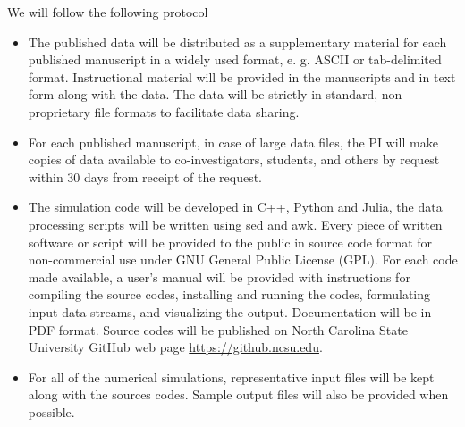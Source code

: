 
We will follow the following protocol 
\begin{itemize}

	\item 
The published data will be distributed as a supplementary  material for each 
published manuscript in a widely used format, e. g. 
ASCII or tab-delimited  format. 
Instructional material will be provided in 
the manuscripts and in text form along  with the data. 
The data will be strictly in standard, non-proprietary file formats 
to facilitate  data sharing. 

\item 
For each published manuscript, in case of large data files, 
the PI will make copies of data 
available to co-investigators, students, and
others by request within 30 days from receipt of the request. 
 


	\item
The simulation code will be developed in C++, Python and Julia, 
the data processing  scripts will be written using sed and awk. 
Every piece of written software or script will 
be provided to the public in source code format for non-commercial use 
under GNU General Public License (GPL). 
For each code made available, a user's manual will be provided with
instructions for compiling the source codes, installing and running the codes,
formulating input data streams, and visualizing the output. Documentation will
be in PDF format.
Source codes will be published on North Carolina State University 
	GitHub web page \url{https://github.ncsu.edu}. 

\item 
For all of the numerical simulations, representative input files will
be kept along with the sources codes. Sample  output files 
will also be provided when possible. 

\end{itemize}
